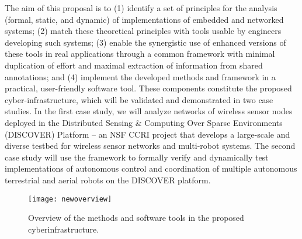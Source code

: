 
The aim of this proposal is to (1) identify a set of principles for
the analysis (formal, static, and dynamic) of implementations of
embedded and networked systems; (2) match these theoretical principles
with tools usable by engineers developing such systems; (3) enable
the synergistic use of enhanced versions of these tools in real
applications through a common framework with minimal duplication of
effort and maximal extraction of information from shared annotations; and (4) implement the developed methods and framework in a practical, user-friendly software tool.
These components constitute the proposed cyber-infrastructure, which will be validated and demonstrated in two case studies.
In the first case study, we will analyze networks of wireless sensor nodes deployed %
in the Distributed Sensing \& Computing Over Sparse Environments (DISCOVER) Platform -- an NSF CCRI project that develops a large-scale and diverse testbed for wireless sensor networks and
multi-robot systems.  The second case study will use the framework to formally verify and dynamically test implementations of autonomous control and coordination of multiple autonomous terrestrial and aerial robots on the DISCOVER platform.

\begin{figure}[!t]
  \centering
  \texttt{[image: newoverview]}
  \caption{Overview of the methods and software tools in the proposed cyberinfrastructure.\vspace{-4pt}}
  \label{fig:overview}
\end{figure}

